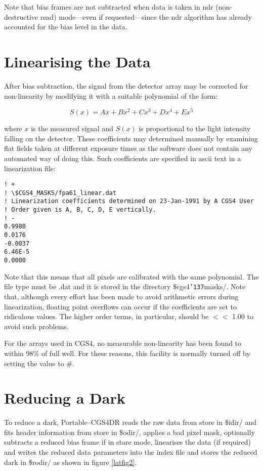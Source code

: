 \documentclass[a4paper]{book}
\renewcommand{\_}{{\tt\char'137}}
\begin{document}
Note that {\sc bias} frames are not subtracted when data is taken in {\sc
ndr} (non-destructive read) mode---even if requested---since the {\sc ndr}
algorithm has already accounted for the bias level in the data.

\section{Linearising the Data}
After {\sc bias} subtraction, the signal from the detector array may be
corrected for non-linearity by modifying it with a suitable polynomial of
the form:

\begin{equation}
  S(x) = Ax + Bx^{2} + Cx^{3} + Dx^{4} + Ex^{5} \label{equation_1}
\end{equation}

where $x$ is the measured signal and $S(x)$ is proportional to the light
intensity falling on the detector. These coefficients may determined
manually by examining {\sc flat} fields taken at different exposure times
as the software does not contain any automated way of doing this. Such
coefficients are specified in {\sc ascii} text in a linearization file:

\begin{verbatim}
! +
! \$CGS4_MASKS/fpa61_linear.dat
! Linearization coefficients determined on 23-Jan-1991 by A CGS4 User
! Order given is A, B, C, D, E vertically.
! -
0.9980
0.0176
-0.0037
6.46E-5
0.0000
\end{verbatim}

Note that this means that all pixels are calibrated with the same
polynomial. The file type must be .dat and it is stored in the directory
{\sc \$cgs4\_masks/}. Note that, although every effort has been made to
avoid arithmetic errors during linearization, floating point overflows can
occur if the coefficients are set to ridiculous values. The higher order
terms, in particular, should be $<<$ 1.00 to avoid such problems.

For the arrays used in CGS4, no measurable non-linearity has been found to
within 98\% of full well. For these reasons, this facility is normally
turned off by setting the value to \#.

\section{Reducing a Dark}
To reduce a {\sc dark}, Portable--CGS4DR reads the raw data from store in
{\sc \$idir}/ and {\sc fits} header information from store in {\sc
\$odir/}, applies a bad pixel mask, optionally subtracts a reduced {\sc
bias} frame if in stare mode, linearises the data (if required) and writes
the reduced data parameters into the index file and stores the reduced
{\sc dark} in {\sc \$rodir/} as shown in figure \ref{latfig2}.
\end{document}
